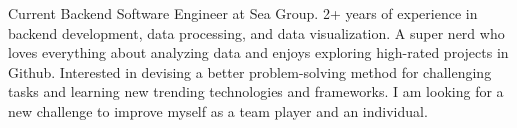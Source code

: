 

\begin{cvparagraph}

Current Backend Software Engineer at Sea Group. 2+ years of experience in backend development, data processing, and data visualization. A super nerd who loves everything about analyzing data and enjoys exploring high-rated projects in Github. Interested in devising a better problem-solving method for challenging tasks and learning new trending technologies and frameworks. I am looking for a new challenge to improve myself as a team player and an individual.
\end{cvparagraph}
